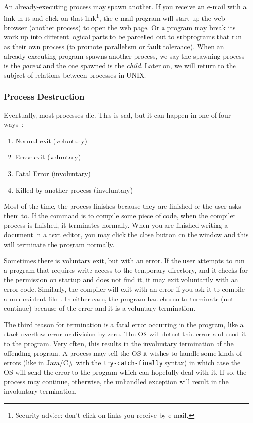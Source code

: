 An already-executing process may spawn another. If you receive an e-mail with a link in it and click on that link\footnote{Security advice: don't click on links you receive by e-mail.}, the e-mail program will start up the web browser (another process) to open the web page. Or a program may break its work up into different logical parts to be parcelled out to subprograms that run as their own process (to promote parallelism or fault tolerance). When an already-executing program spawns another process, we say the spawning process is the \textit{parent} and the one spawned is the \textit{child}. Later on, we will return to the subject of relations between processes in UNIX.

\subsubsection*{Process Destruction}

Eventually, most processes die. This is sad, but it can happen in one of four ways~\cite{mos}:
\begin{enumerate}
	\item Normal exit (voluntary) 
	\item Error exit (voluntary)
	\item Fatal Error (involuntary)
	\item Killed by another process (involuntary)
\end{enumerate}

Most of the time, the process finishes because they are finished or the user asks them to. If the command is to compile some piece of code, when the compiler process is finished, it terminates normally. When you are finished writing a document in a text editor, you may click the close button on the window and this will terminate the program normally.

Sometimes there is voluntary exit, but with an error. If the user attempts to run a program that requires write access to the temporary directory, and it checks for the permission on startup and does not find it, it may exit voluntarily with an error code. Similarly, the compiler will exit with an error if you ask it to compile a non-existent file~\cite{mos}. In either case, the program has chosen to terminate (not continue) because of the error and it is a voluntary termination.

The third reason for termination is a fatal error occurring in the program, like a stack overflow error or division by zero. The OS will detect this error and send it to the program. Very often, this results in the involuntary termination of the offending program. A process may tell the OS it wishes to handle some kinds of errors (like in Java/C\# with the \texttt{try-catch-finally} syntax) in which case the OS will send the error to the program which can hopefully deal with it. If so, the process may continue, otherwise, the unhandled exception will result in the involuntary termination.

